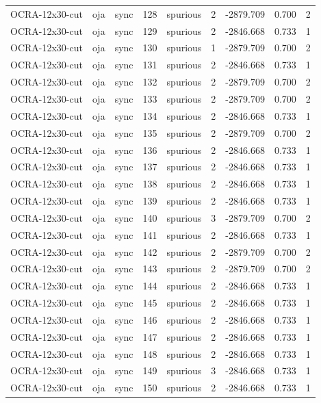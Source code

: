 \begin{tabular}{lllrlrrrr}
OCRA-12x30-cut & oja & sync & 128 & spurious & 2 & -2879.709 & 0.700 & 2 \\
OCRA-12x30-cut & oja & sync & 129 & spurious & 2 & -2846.668 & 0.733 & 1 \\
OCRA-12x30-cut & oja & sync & 130 & spurious & 1 & -2879.709 & 0.700 & 2 \\
OCRA-12x30-cut & oja & sync & 131 & spurious & 2 & -2846.668 & 0.733 & 1 \\
OCRA-12x30-cut & oja & sync & 132 & spurious & 2 & -2879.709 & 0.700 & 2 \\
OCRA-12x30-cut & oja & sync & 133 & spurious & 2 & -2879.709 & 0.700 & 2 \\
OCRA-12x30-cut & oja & sync & 134 & spurious & 2 & -2846.668 & 0.733 & 1 \\
OCRA-12x30-cut & oja & sync & 135 & spurious & 2 & -2879.709 & 0.700 & 2 \\
OCRA-12x30-cut & oja & sync & 136 & spurious & 2 & -2846.668 & 0.733 & 1 \\
OCRA-12x30-cut & oja & sync & 137 & spurious & 2 & -2846.668 & 0.733 & 1 \\
OCRA-12x30-cut & oja & sync & 138 & spurious & 2 & -2846.668 & 0.733 & 1 \\
OCRA-12x30-cut & oja & sync & 139 & spurious & 2 & -2846.668 & 0.733 & 1 \\
OCRA-12x30-cut & oja & sync & 140 & spurious & 3 & -2879.709 & 0.700 & 2 \\
OCRA-12x30-cut & oja & sync & 141 & spurious & 2 & -2846.668 & 0.733 & 1 \\
OCRA-12x30-cut & oja & sync & 142 & spurious & 2 & -2879.709 & 0.700 & 2 \\
OCRA-12x30-cut & oja & sync & 143 & spurious & 2 & -2879.709 & 0.700 & 2 \\
OCRA-12x30-cut & oja & sync & 144 & spurious & 2 & -2846.668 & 0.733 & 1 \\
OCRA-12x30-cut & oja & sync & 145 & spurious & 2 & -2846.668 & 0.733 & 1 \\
OCRA-12x30-cut & oja & sync & 146 & spurious & 2 & -2846.668 & 0.733 & 1 \\
OCRA-12x30-cut & oja & sync & 147 & spurious & 2 & -2846.668 & 0.733 & 1 \\
OCRA-12x30-cut & oja & sync & 148 & spurious & 2 & -2846.668 & 0.733 & 1 \\
OCRA-12x30-cut & oja & sync & 149 & spurious & 3 & -2846.668 & 0.733 & 1 \\
OCRA-12x30-cut & oja & sync & 150 & spurious & 2 & -2846.668 & 0.733 & 1 \\

\end{tabular}

